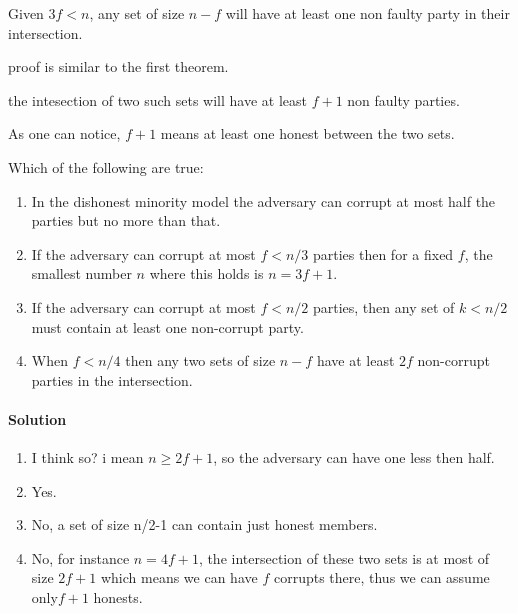 \begin{thm}
    Given $3f<n$, any set of size $n-f$ will have at least one non faulty party in their intersection.
\end{thm}
proof is similar to the first theorem.

\begin{corollary}
    the intesection of two such sets will have at least $f+1$ non faulty parties.
\end{corollary}
As one can notice, $f+1$ means at least one honest between the two sets.
\begin{xca}[Quiz 1.E]
    Which of the following are true:
    \begin{enumerate}
        \item In the dishonest minority model the adversary can corrupt at most half the parties but
         no more than that.
        \item If the adversary can corrupt at most $f<n/3$ parties then for a fixed $f$, the 
        smallest number $n$ where this holds is $n=3f+1$.
        \item If the adversary can corrupt at most $f<n/2$ parties, then any set of $k<n/2$ must 
        contain at least one non-corrupt party.
        \item When $f<n/4$ then any two sets of size $n-f$ have at least $2f$ 
        non-corrupt parties in the intersection.
    \end{enumerate}
    
    \paragraph{Solution}

    \begin{enumerate}
        \item I think so? i mean $n \ge 2f+1$, so the adversary can have one less then half.
        \item Yes.
        \item No, a set of size n/2-1 can contain just honest members.
        \item No, for instance $n=4f+1$, the intersection of these two sets is at most of size $2f+1$ which means we can have 
        $f$ corrupts there, thus we can assume only$f+1$ honests.
    \end{enumerate}


\end{xca}

